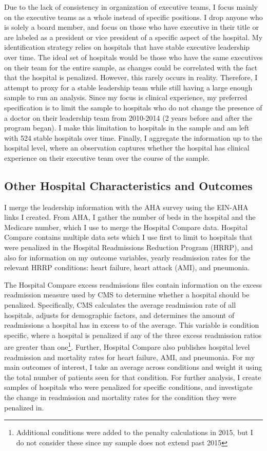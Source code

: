 \documentclass[12pt]{article}
\begin{document}
    Due to the lack of consistency in organization of executive teams, I focus mainly on the executive teams as a whole instead of specific positions. I drop anyone who is solely a board member, and focus on those who have executive in their title or are labeled as a president or vice president of a specific aspect of the hospital. My identification strategy relies on hospitals that have stable executive leadership over time. The ideal set of hospitals would be those who have the same executives on their team for the entire sample, as changes could be correlated with the fact that the hospital is penalized. However, this rarely occurs in reality. Therefore, I attempt to proxy for a stable leadership team while still having a large enough sample to run an analysis. Since my focus is clinical experience, my preferred specification is to limit the sample to hospitals who do not change the presence of a doctor on their leadership team from 2010-2014 (2 years before and after the program began). I make this limitation to hospitals in the sample and am left with 524 stable hospitals over time. Finally, I aggregate the information up to the hospital level, where an observation captures whether the hospital has clinical experience on their executive team over the course of the sample. 


    \subsection{Other Hospital Characteristics and Outcomes}

    I merge the leadership information with the AHA survey using the EIN-AHA links I created. From AHA, I gather the number of beds in the hospital and the Medicare number, which I use to merge the Hospital Compare data. Hospital Compare contains multiple data sets which I use first to limit to hospitals that were penalized in the Hospital Readmissions Reduction Program (HRRP), and also for information on my outcome variables, yearly readmission rates for the relevant HRRP conditions: heart failure, heart attack (AMI), and pneumonia.

    The Hospital Compare excess readmissions files contain information on the excess readmission measure used by CMS to determine whether a hospital should be penalized. Specifically, CMS calculates the average readmission rate of all hospitals, adjusts for demographic factors, and determines the amount of readmissions a hospital has in excess to of the average. This variable is condition specific, where a hospital is penalized if any of the three excess readmission ratios are greater than one\footnote{Additional conditions were added to the penalty calculations in 2015, but I do not consider these since my sample does not extend past 2015}. Further, Hospital Compare also publishes hospital level readmission and mortality rates for heart failure, AMI, and pneumonia. For my main outcomes of interest, I take an average across conditions and weight it using the total number of patients seen for that condition. For further analysis, I create samples of hospitals who were penalized for specific conditions, and investigate the change in readmission and mortality rates for the condition they were penalized in.
\end{document}
